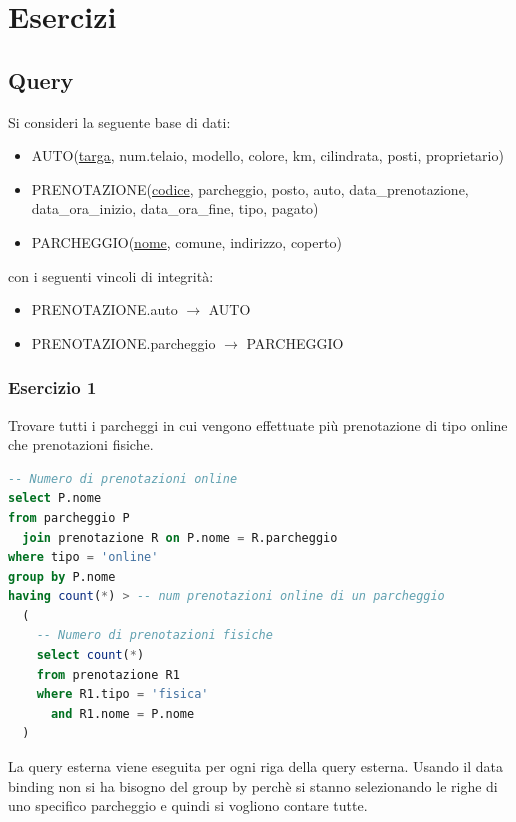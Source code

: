 \documentclass[a4paper,twoside]{article}
\begin{document}
\section{Esercizi}
\subsection{Query}
Si consideri la seguente base di dati:
\begin{itemize}
  \item AUTO(\underline{targa}, num.telaio, modello, colore, km, cilindrata, posti,
    proprietario)

  \item PRENOTAZIONE(\underline{codice}, parcheggio, posto, auto, data\_prenotazione,
    data\_ora\_inizio, data\_ora\_fine, tipo, pagato)

  \item PARCHEGGIO(\underline{nome}, comune, indirizzo, coperto)
\end{itemize}
con i seguenti vincoli di integrità:
\begin{itemize}
  \item PRENOTAZIONE.auto \( \to  \) AUTO
  \item PRENOTAZIONE.parcheggio \( \to  \) PARCHEGGIO
\end{itemize}

\subsubsection{Esercizio 1}
Trovare tutti i parcheggi in cui vengono effettuate più prenotazione di
tipo online che prenotazioni fisiche.
\begin{lstlisting}[language=SQL]
-- Numero di prenotazioni online
select P.nome
from parcheggio P
  join prenotazione R on P.nome = R.parcheggio
where tipo = 'online'
group by P.nome
having count(*) > -- num prenotazioni online di un parcheggio
  (
    -- Numero di prenotazioni fisiche
    select count(*)
    from prenotazione R1
    where R1.tipo = 'fisica'
      and R1.nome = P.nome
  )
\end{lstlisting}
La query esterna viene eseguita per ogni riga della query esterna. Usando il
data binding non si ha bisogno del group by perchè si stanno selezionando le
righe di uno specifico parcheggio e quindi si vogliono contare tutte.
\end{document}
